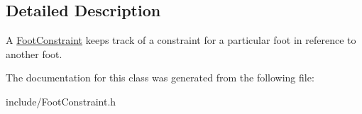 \subsection{Detailed Description}
A \hyperlink{classfsp_1_1_foot_constraint}{Foot\-Constraint} keeps track of a constraint for a particular foot in reference to another foot. 

The documentation for this class was generated from the following file\-:\begin{DoxyCompactItemize}
\item 
include/Foot\-Constraint.\-h\end{DoxyCompactItemize}
